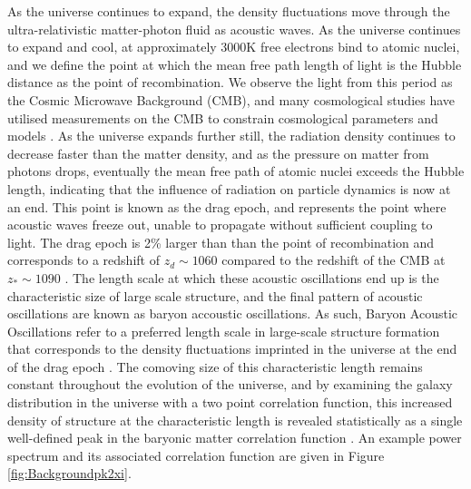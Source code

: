 \documentclass[titlesmallcaps, examinerscopy, copyrightpage]{uqthesis}
\begin{document}
As the universe continues to expand, the density fluctuations move through the ultra-relativistic matter-photon fluid as acoustic waves. As the universe continues to expand and cool, at approximately 3000K free electrons bind to atomic nuclei, and we define the point at which the mean free path length of light is the Hubble distance as the point of recombination. We observe the light from this period as the Cosmic Microwave Background (CMB), and many cosmological studies have utilised measurements on the CMB to constrain cosmological parameters and models \citep{BoggessMather1992,BennettLarson2013,Planck20151}. As the universe expands further still, the radiation density continues to decrease faster than the matter density, and as the pressure on matter from photons drops, eventually the mean free path of atomic nuclei exceeds the Hubble length, indicating that the influence of radiation on particle dynamics is now at an end. This point is known as the drag epoch, and represents the point where acoustic waves freeze out, unable to propagate without sufficient coupling to light. The drag epoch is 2\% larger than than the point of recombination and corresponds to a redshift of $z_d \sim 1060$ compared to the redshift of the CMB at $z_* \sim 1090$ \cite{Planck2015Parameters}. The length scale at which these acoustic oscillations end up is the characteristic size of large scale structure, and the final pattern of acoustic oscillations are known as baryon accoustic oscillations. As such, Baryon Acoustic Oscillations refer to a preferred length scale in large-scale structure formation that corresponds to the density fluctuations imprinted in the universe at the end of the drag epoch \citep{BondEfstathiou1984, Holtzman1989, HuSugiyama1996, EisensteinHu1998, MeiksinWhitePeacock1999}. The comoving size of this characteristic length remains constant throughout the evolution of the universe, and by examining the galaxy distribution in the universe with a two point correlation function, this increased density of structure at the characteristic length is revealed statistically as a single well-defined peak in the baryonic matter correlation function \citep{Matsubara2004}. An example power spectrum and its associated correlation function are given in Figure \ref{fig:Backgroundpk2xi}.
\end{document}
